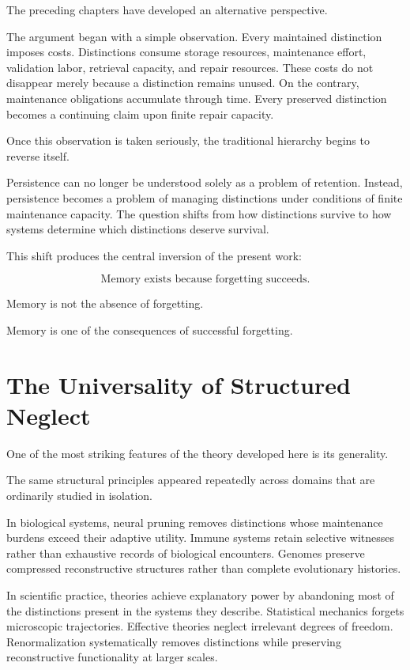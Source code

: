 \documentclass[12pt,oneside]{book}
\theoremstyle{plain} \newtheorem{theorem}{Theorem}[chapter] \newtheorem{lemma}[theorem]{Lemma} \newtheorem{proposition}[theorem]{Proposition} \newtheorem{corollary}[theorem]{Corollary}
\theoremstyle{definition} \newtheorem{definition}[theorem]{Definition} \newtheorem{axiom}[theorem]{Axiom} \newtheorem{construction}[theorem]{Construction}
\theoremstyle{remark} \newtheorem{remark}[theorem]{Remark} \newtheorem{example}[theorem]{Example}
\begin{document}
The preceding chapters have developed an alternative perspective.

The argument began with a simple observation. Every maintained distinction imposes costs. Distinctions consume storage resources, maintenance effort, validation labor, retrieval capacity, and repair resources. These costs do not disappear merely because a distinction remains unused. On the contrary, maintenance obligations accumulate through time. Every preserved distinction becomes a continuing claim upon finite repair capacity.

Once this observation is taken seriously, the traditional hierarchy begins to reverse itself.

Persistence can no longer be understood solely as a problem of retention. Instead, persistence becomes a problem of managing distinctions under conditions of finite maintenance capacity. The question shifts from how distinctions survive to how systems determine which distinctions deserve survival.

This shift produces the central inversion of the present work:

\[
\text{Memory exists because forgetting succeeds.}
\]

Memory is not the absence of forgetting.

Memory is one of the consequences of successful forgetting.

\section{The Universality of Structured Neglect}

One of the most striking features of the theory developed here is its generality.

The same structural principles appeared repeatedly across domains that are ordinarily studied in isolation.

In biological systems, neural pruning removes distinctions whose maintenance burdens exceed their adaptive utility. Immune systems retain selective witnesses rather than exhaustive records of biological encounters. Genomes preserve compressed reconstructive structures rather than complete evolutionary histories.

In scientific practice, theories achieve explanatory power by abandoning most of the distinctions present in the systems they describe. Statistical mechanics forgets microscopic trajectories. Effective theories neglect irrelevant degrees of freedom. Renormalization systematically removes distinctions while preserving reconstructive functionality at larger scales.
\end{document}
